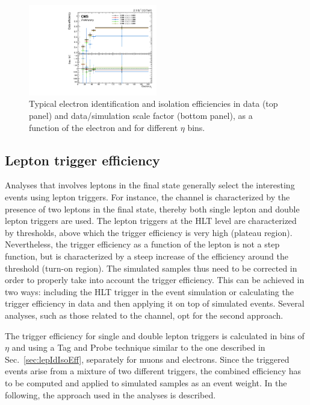\begin{figure}[htb]
\centering
\includegraphics[width=0.5\textwidth]{images/effEleIdIso.pdf}
\caption{Typical electron identification and isolation efficiencies in data (top panel) and data/simulation scale factor (bottom panel), as a function of the electron \pt and for different $\eta$ bins.}\label{fig:eleIdIso}
\end{figure}
	
\subsection{Lepton trigger efficiency}\label{sec:trigeff}
Analyses that involves leptons in the final state generally select the interesting events using lepton triggers. For instance, the \hwwllnn channel is characterized by the presence of two leptons in the final state, thereby both single lepton and double lepton triggers are used. The lepton triggers at the HLT level are characterized by \pt thresholds, above which the trigger efficiency is very high (plateau region). Nevertheless, the trigger efficiency as a function of the lepton \pt is not a step function, but is characterized by a steep increase of the efficiency around the \pt threshold (turn-on region). The simulated samples thus need to be corrected in order to properly take into account the trigger efficiency. This can be achieved in two ways: including the HLT trigger in the event simulation or calculating the trigger efficiency in data and then applying it on top of simulated events. Several analyses, such as those related to the \hwwllnn channel, opt for the second approach.

The trigger efficiency for single and double lepton triggers is calculated in bins of $\eta$ and \pt using a Tag and Probe technique similar to the one described in Sec.~\ref{sec:lepIdIsoEff}, separately for muons and electrons. Since the triggered events arise from a mixture of two different triggers, the combined efficiency has to be computed and applied to simulated samples as an event weight. In the following, the approach used in the \hwwllnn analyses is described.

